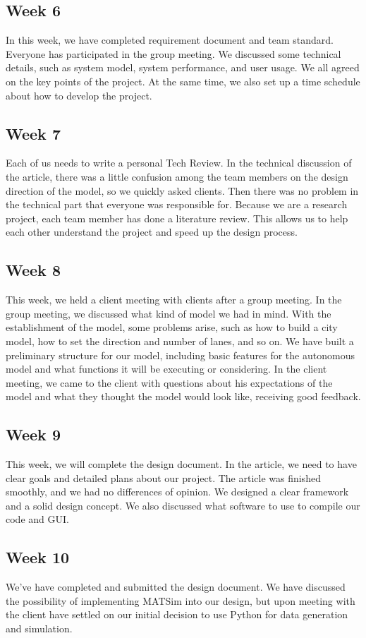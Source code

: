 \documentclass[onecolumn, draftclsnofoot,10pt, compsoc]{IEEEtran}
\begin{document}
\subsection{Week 6}
In this week, we have completed requirement document and team standard.
Everyone has participated in the group meeting.
We discussed some technical details, such as system model, system performance, and user usage.
We all agreed on the key points of the project.
At the same time, we also set up a time schedule about how to develop the project.
\subsection{Week 7}
Each of us needs to write a personal Tech Review.
In the technical discussion of the article, there was a little confusion among the team members on the design direction of the model, so we quickly asked clients.
Then there was no problem in the technical part that everyone was responsible for.
Because we are a research project, each team member has done a literature review.
This allows us to help each other understand the project and speed up the design process.
\subsection{Week 8}
This week, we held a client meeting with clients after a group meeting.
In the group meeting, we discussed what kind of model we had in mind.
With the establishment of the model, some problems arise, such as how to build a city model, how to set the direction and number of lanes, and so on.
We have built a preliminary structure for our model, including basic features for the autonomous model and what functions it will be executing or considering.
In the client meeting, we came to the client with questions about his expectations of the model and what they thought the model would look like, receiving good feedback.
\subsection{Week 9}
This week, we will complete the design document.
In the article, we need to have clear goals and detailed plans about our project.
The article was finished smoothly, and we had no differences of opinion.
We designed a clear framework and a solid design concept.
We also discussed what software to use to compile our code and GUI.
\subsection{Week 10}
We've have completed and submitted the design document.
We have discussed the possibility of implementing MATSim into our design, but upon meeting with the client have settled on our initial decision to use Python for data generation and simulation.
\end{document}
